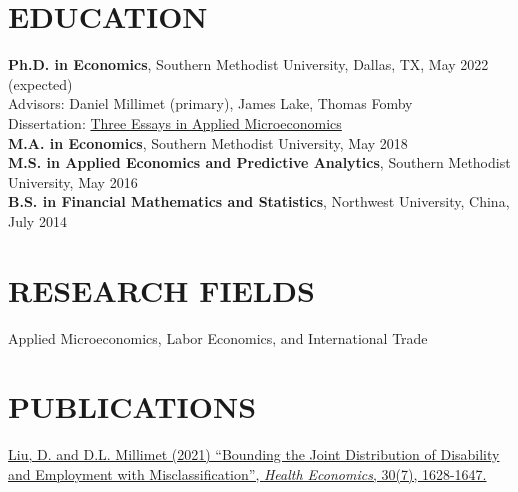 \documentclass[11pt]{res}
\begin{document}
\thispagestyle{empty}
\address{
Southern Methodist University\\
Department of Economics\\
Box 0496, SMU, Dallas, TX 75275-0496\\
}
\address{
Cell Phone: (214) 984-4354 \\
Website: \href{http://econdingliu.weebly.com}{http://econdingliu.weebly.com}\\
Email: \href{mailto:dingl@smu.edu}{\texttt{dingl@smu.edu}}\\
}

\begin{resume}
\hspace{-0.5in}\makebox[6.1in]{\hrulefill}

\section{EDUCATION}\vspace{2mm}
    {\bf Ph.D. in Economics}, Southern Methodist University, Dallas, TX, May 2022 (expected)\\
    Advisors: Daniel Millimet (primary), James Lake, Thomas Fomby\\
    Dissertation: \href{https://econdingliu.weebly.com/uploads/1/2/9/0/129022969/dissertationabstractdl.pdf}{Three Essays in Applied Microeconomics}\vspace{1.5mm}\\
    {\bf M.A. in Economics}, Southern Methodist University, May 2018\vspace{1.5mm}\\
    {\bf M.S. in Applied Economics and Predictive Analytics}, Southern Methodist University, May 2016\vspace{1.5mm}\\
    {\bf B.S. in Financial Mathematics and Statistics}, Northwest University, China, July 2014

\section{RESEARCH FIELDS}\vspace{2mm}
Applied Microeconomics, Labor Economics, and International Trade

\section{PUBLICATIONS}\vspace{2mm}
\href{https://onlinelibrary.wiley.com/doi/abs/10.1002/hec.4265}{Liu, D. and D.L. Millimet (2021) ``Bounding the Joint Distribution of Disability and Employment with Misclassification'', \emph{Health Economics}, 30(7), 1628-1647.}


\end{resume}
\end{document}
